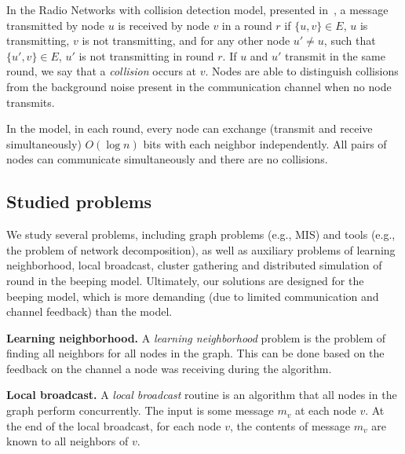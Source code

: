 {
%
In the Radio Networks with collision detection model, presented in~\cite{chlamtac1985broadcasting}, a message transmitted by node $u$ is received by node $v$ in a round $r$ if $\{u,v\}\in E$, $u$ is transmitting, $v$ is not transmitting, and for any other node $u'\neq u$, such that $\{u',v\}\in E$, $u'$ is not transmitting in round $r$. If $u$ and $u'$ transmit in the same round, we say that a \emph{collision} occurs at $v$. Nodes are able to distinguish collisions from the background noise present in the communication channel when no node transmits.



In the \congest model, in each round, every node can exchange (transmit and receive simultaneously) $O(\log n)$ bits with each neighbor independently. All pairs of nodes can communicate simultaneously and there are no collisions.


\subsection{Studied problems}

We study several problems, including graph problems (e.g., MIS) and tools (e.g.,  the problem of network decomposition), as well as auxiliary problems of learning neighborhood, local broadcast, cluster gathering and distributed simulation of \congest round in the beeping model. Ultimately, our solutions are designed for the beeping model, which is more demanding (due to limited communication and channel feedback) than the \congest model.  


\noindent\textbf{Learning neighborhood.} A \emph{learning neighborhood} problem is the problem of finding all neighbors for all nodes in the graph. 
This can be done based on the feedback on the channel a node was receiving during the algorithm.

\noindent\textbf{Local broadcast.} A \emph{local broadcast} routine is an algorithm that all nodes in the graph perform concurrently. The input is some message $m_v$ at each node $v$. At the end of the local broadcast, for each node $v$, the contents of message $m_v$ are known to all neighbors of $v$.

}
